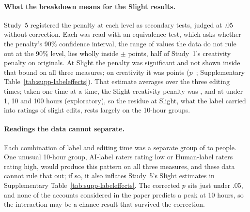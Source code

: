 \paragraph*{What the breakdown means for the Slight results.}
Study~5 registered the penalty at each level as secondary tests, judged at .05 without correction. Each was read with an equivalence test, which asks whether the penalty's 90\% confidence interval, the range of values the data do not rule out at the 90\% level, lies wholly inside $\pm$\SourceBound{} points, half of Study~1's creativity penalty on originals. At Slight the penalty was significant and not shown inside that bound on all three measures; on creativity it was \SFiveCreatPenaltySlightEst{} points ($p$~\SFiveCreatPenaltySlightP; Supplementary Table~\ref{tab:supp-labeleffects}). That estimate averages over the three editing times; taken one time at a time, the Slight creativity penalty was \XSTimeCheckSFiveCreatPenaltyUnderOneHourSlightEst, \XSTimeCheckSFiveCreatPenaltyTenHoursSlightEst{} and \XSTimeCheckSFiveCreatPenaltyHundredHoursSlightEst{} at under 1, 10 and 100 hours (exploratory), so the residue at Slight, what the label carried into ratings of slight edits, rests largely on the 10-hour groups.

\paragraph*{Readings the data cannot separate.}
Each combination of label and editing time was a separate group of \SFiveNCellMin{} to \SFiveNCellMax{} people. One unusual 10-hour group, AI-label raters rating low or Human-label raters rating high, would produce this pattern on all three measures, and these data cannot rule that out; if so, it also inflates Study~5's Slight estimates in Supplementary Table~\ref{tab:supp-labeleffects}. The corrected $p$ sits just under .05, and none of the accounts considered in the paper predicts a peak at 10 hours, so the interaction may be a chance result that survived the correction.
